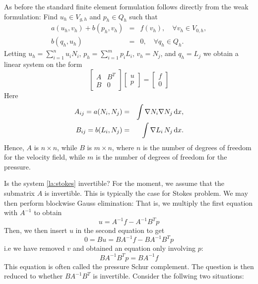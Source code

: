 As before the standard finite element formulation follows directly from the weak formulation:
Find $u_h\in V_{g,h}$ and $p_h\in Q_h$ such that
\begin{eqnarray}
\label{eq:stdGalerkin1}
a(u_h, v_h ) + b(p_h, v_h) &=& f(v_h),\quad \forall v_h\in V_{0,h}, \\
\label{eq:stdGalerkin2}
b(q_h, u_h) &=& 0,\quad \forall q_h \in Q_h .
\end{eqnarray}
Letting $u_h=\sum_{i=1}^n u_i N_i$, $p_h=\sum_{i=1}^m p_i L_i$, $v_h=N_j$, and $q_h=L_j$
we obtain a linear system on the form
\begin{equation}
\left[ %
	\begin{array}{cc}
	A & B^T\\
	B & 0
	\end{array}
\right]
\left[ %
	\begin{array}{c}
	u\\
	p
	\end{array}
\right]
=
\left[ %
	\begin{array}{c}
	f\\
	0
	\end{array}
\right]
\label{la:stokes}
\end{equation}
Here
\begin{eqnarray}
A_{ij} = a(N_i,N_j) &=& \int\nabla N_i \nabla N_j \, \mathrm{d}x, \\
B_{ij} = b(L_i,N_j) &=& \int\nabla L_i \, N_j \, \mathrm{d}x.
\end{eqnarray}
Hence, $A$ is $n\times n$, while $B$ is $m\times n$,
where $n$ is the number of degrees of freedom for the velocity field, while
$m$ is the number of degrees of freedom for the pressure.



Is the system \eqref{la:stokes} invertible?  For the moment, we assume that the submatrix $A$ is invertible. This is typically the case for
Stokes problem. We may then perform blockwise Gauss elimination:
That is,
we multiply the first equation with $A^{-1}$ to obtain
\[u = A^{-1}f - A^{-1}B^Tp\]
Then, we then insert $u$ in the second equation to get
\[0 = Bu = BA^{-1}f - BA^{-1}B^Tp\]
i.e we have removed $v$ and obtained an equation only involving $p$:
\[BA^{-1}B^Tp = BA^{-1}f\]
This equation is often called the pressure Schur complement. The question is then reduced to whether $BA^{-1}B^T$ is invertible.
Consider the follwing two situations:

